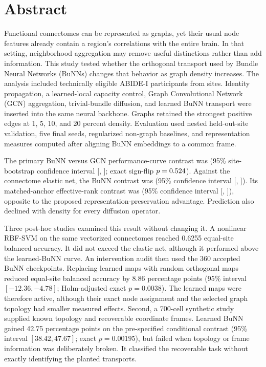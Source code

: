 \documentclass[11pt,a4paper]{article}
\begin{document}
\section*{Abstract}

Functional connectomes can be represented as graphs, yet their usual node
features already contain a region's correlations with the entire brain. In
that setting, neighborhood aggregation may remove useful distinctions rather
than add information. This study tested whether the orthogonal transport used
by Bundle Neural Networks (BuNNs) changes that behavior as graph density
increases. The analysis included \StudyParticipants{} technically eligible
ABIDE-I participants from \StudySites{} sites. Identity propagation, a
learned-local capacity control, Graph Convolutional Network (GCN) aggregation,
trivial-bundle diffusion, and learned BuNN transport were inserted into the
same neural backbone. Graphs retained the strongest positive edges at 1, 5,
10, and 20 percent density. Evaluation used nested held-out-site validation,
five final seeds, regularized non-graph baselines, and representation measures
computed after aligning BuNN embeddings to a common frame.

The primary BuNN versus GCN performance-curve contrast was
\BunnGcnEstimate{} (95\% site-bootstrap confidence interval
[\BunnGcnCILow{}, \BunnGcnCIHigh{}]; exact sign-flip $p=0.524$). Against
the connectome elastic net, the BuNN contrast was \BunnElasticEstimate{} (95\%
confidence interval [\BunnElasticCILow{}, \BunnElasticCIHigh{}]). Its
matched-anchor effective-rank contrast was \RankEstimate{} (95\% confidence
interval [\RankCILow{}, \RankCIHigh{}]), opposite to the proposed
representation-preservation advantage. Prediction also declined with density
for every diffusion operator.

Three post-hoc studies examined this result without changing it. A nonlinear
RBF-SVM on the same vectorized connectomes reached 0.6255 equal-site balanced
accuracy. It did not exceed the elastic net, although it performed above the
learned-BuNN curve. An intervention audit then used the 360 accepted BuNN
checkpoints. Replacing learned
maps with random orthogonal maps reduced equal-site balanced accuracy by 8.86
percentage points (95\% interval $[-12.36,-4.78]$; Holm-adjusted exact
$p=0.0038$). The learned maps were therefore active, although their exact node
assignment and the selected graph topology had smaller measured effects.
Second, a 700-cell synthetic study supplied known topology and recoverable
coordinate frames. Learned BuNN gained 42.75 percentage points on the
pre-specified conditional contrast (95\% interval $[38.42,47.67]$; exact
$p=0.00195$), but failed when topology or frame information was deliberately
broken. It classified the recoverable task without exactly identifying the
planted transports.
\end{document}
